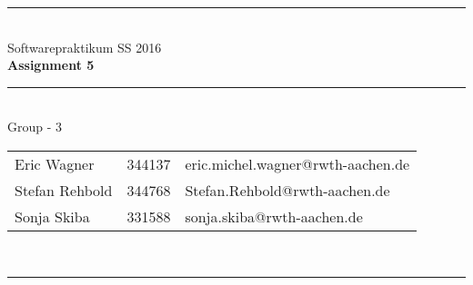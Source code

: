 \documentclass[a4paper,12pt]{article}
\begin{document}
\begin{center}
	\rule{\textwidth}{0.1pt}\\[1cm]
	
	\Large Softwarepraktikum SS 2016\\\bf Assignment 5
\end{center}


\begin{center}

	\rule{\textwidth}{0.1pt}\\[0.5cm]

	{\Large Group - 3\\[5mm]} 

	\begin{tabular}{lll}
		
		Eric Wagner & 344137 & eric.michel.wagner@rwth-aachen.de \\

		Stefan Rehbold & 344768 & Stefan.Rehbold@rwth-aachen.de \\

		Sonja Skiba & 331588 & sonja.skiba@rwth-aachen.de \\

	\end{tabular}\\[0.5cm]

	\rule{\textwidth}{0.1pt}\\[1cm]

\end{center}




\end{document}
